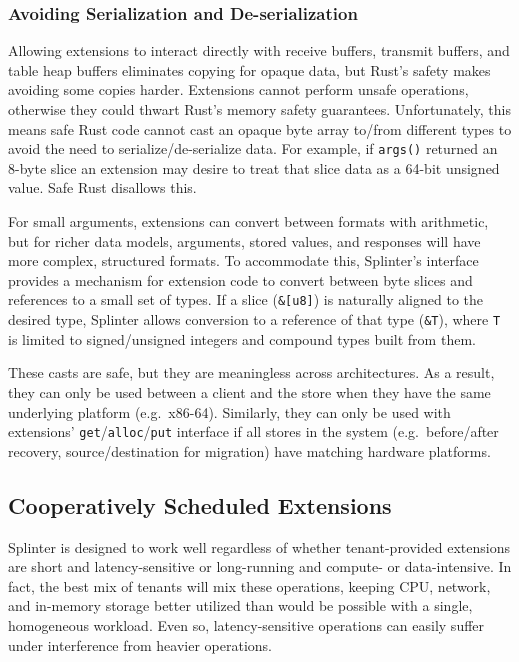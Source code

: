 \subsubsection{Avoiding Serialization and De-serialization}
\label{sec:ser-des}

Allowing extensions to interact directly with receive buffers, transmit buffers,
  and table heap buffers eliminates copying for opaque data, but Rust's safety
  makes avoiding some copies harder.
Extensions cannot perform unsafe operations, otherwise they could thwart Rust's
  memory safety guarantees.
Unfortunately, this means safe Rust code cannot cast an opaque byte array to/from
  different types to avoid the need to serialize/de-serialize data.
For example, if \texttt{args()} returned an 8-byte slice an extension may desire
  to treat that slice data as a 64-bit unsigned value.
Safe Rust disallows this.

For small arguments, extensions can convert between
  formats with arithmetic, but for richer data models, arguments, stored values, and responses will
  have more complex, structured formats.
To accommodate this, Splinter's interface provides a mechanism for extension
  code to convert between byte slices and references to a small set of types.
If a slice (\texttt{\&[u8]}) is naturally aligned to the desired
  type, Splinter allows conversion to a reference of that type
  (\texttt{\&T}), where \texttt{T} is limited to signed/unsigned
  integers and compound types built from them.

These casts are safe, but they are meaningless across architectures. As a
  result, they can only be used between a client and the store when they have
  the same underlying platform (e.g.\ x86-64).
Similarly, they can only be used with extensions'
  \texttt{get}/\texttt{alloc}/\texttt{put} interface if all stores in
  the system (e.g.\  before/after recovery, source/destination for migration) have matching hardware
  platforms.

\subsection{Cooperatively Scheduled Extensions}
\label{sec:coop}

Splinter is designed to work well regardless of whether tenant-provided
  extensions are short and latency-sensitive or long-running and compute- or
  data-intensive.
In fact, the best mix of tenants will mix these operations, keeping CPU,
  network, and in-memory storage better utilized than would be possible with a
  single, homogeneous workload.
Even so, latency-sensitive operations can easily suffer under interference from
  heavier operations.

